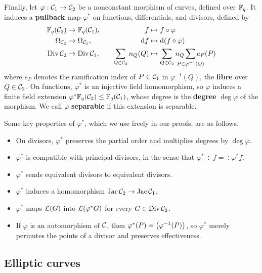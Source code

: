 \documentclass[twocolumn, 11pt]{scrartcl}
\begin{document}
Finally, let $\varphi:\mcC_1\to\mcC_2$ be a nonconstant morphism of curves, defined over $\bbF_q$. It induces a \textbf{pullback} map $\varphi^*$ on functions, differentials, and divisors, defined by
\begin{alignat*}{2}
    \bbF_q(\mcC_2)&\to\bbF_q(\mcC_1), & \quad f &\mapsto f\circ\varphi \\
    \Omega_{\mcC_2}&\to\Omega_{\mcC_1}, & \quad \df &\mapsto \dx[(f\circ\varphi)] \\
    \Div\mcC_2&\to\Div\mcC_1, & \quad \sum_{Q\in\mcC_2} n_Q(Q) &\mapsto \sum_{Q\in\mcC_2} n_Q \sum_{\mathclap{P\in\varphi^{-1}(Q)}} e_P(P)
\end{alignat*}
where $e_P$ denotes the ramification index of $P\in\mcC_1$ in $\varphi^{-1}(Q)$, the \textbf{fibre} over $Q\in\mcC_2$. On functions, $\varphi^*$ is an injective field homomorphism, so $\varphi$ induces a finite field extension $\varphi^*\bbF_q(\mcC_2)\leq\bbF_q(\mcC_1)$, whose degree is the \textbf{degree} $\deg\varphi$ of the morphism. We call $\varphi$ \textbf{separable} if this extension is separable.

Some key properties of $\varphi^*$, which we use freely in our proofs, are as follows.
\begin{itemize}
    \item On divisors, $\varphi^*$ preserves the partial order and multiplies degrees by $\deg\varphi$.
    \item $\varphi^*$ is compatible with principal divisors, in the sense that $\varphi^*\div f=\div\varphi^*f$.
    \item $\varphi^*$ sends equivalent divisors to equivalent divisors.
    \item $\varphi^*$ induces a homomorphism $\Jac\mcC_2\to\Jac\mcC_1$.
    \item $\varphi^*$ maps $\mcL(G)$ into $\mcL(\varphi^*G)$ for every $G\in\Div\mcC_2$.
    \item If $\varphi$ is an automorphism of $\mcC$, then $\varphi^*(P)=\pa[\big]{\varphi^{-1}(P)}$, so $\varphi^*$ merely permutes the points of a divisor and preserves effectiveness.
\end{itemize}

\subsection{Elliptic curves} \label{section:elliptic-curves}
\end{document}
